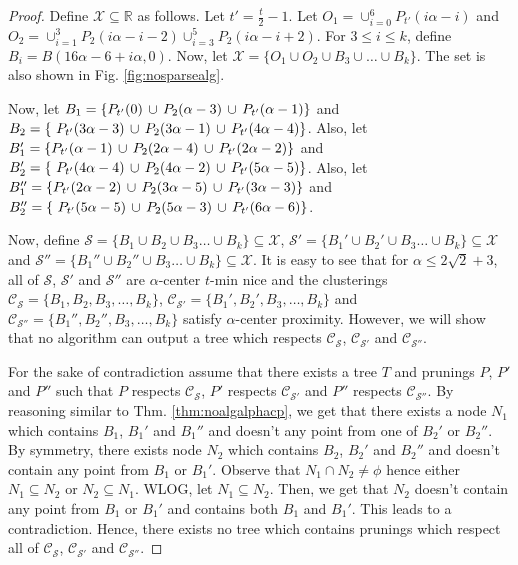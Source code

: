 \documentclass[anon,12pt]{colt2016} %
\newcommand{\mc}{\mathcal}
\begin{document}
\begin{proof}
Define $\mc X \subseteq \mathbb{R}$ as follows. Let $t' = \frac{t}{2}-1$. Let $O_1 = \cup_{i=0}^6 P_{t'}(i\alpha-i)$ and $O_2 = \cup_{i=1}^3 P_2(i\alpha-i-2) \cup_{i=3}^5 P_2(i\alpha-i+2)$. For $3\le i\le k$, define $B_i = B(16\alpha-6+i\alpha, 0)$. Now, let $\mc X = \{O_1 \cup O_2 \cup B_3 \cup \ldots \cup B_k\}$. The set is also shown in Fig. \ref{fig:nosparsealg}.

Now, let $B_1 = \{P_{t'}(0) \thinspace\cup\thinspace  P_{2}(\alpha-3) \thinspace\cup\thinspace P_{t'}(\alpha-1) \}$ and $B_2 = \{\ P_{t'}(3\alpha-3) \thinspace\cup\thinspace P_{2}(3\alpha-1)\thinspace\cup\thinspace P_{t'}(4\alpha-4)\}$. Also, let $B_1' = \{P_{t'}(\alpha-1) \thinspace\cup\thinspace  P_{2}(2\alpha-4) \thinspace\cup\thinspace P_{t'}(2\alpha-2) \}$ and $B_2' = \{\ P_{t'}(4\alpha-4) \thinspace\cup\thinspace P_{2}(4\alpha-2)\thinspace\cup\thinspace P_{t'}(5\alpha-5)\}$. Also, let $B_1'' = \{P_{t'}(2\alpha-2) \thinspace\cup\thinspace  P_{2}(3\alpha-5) \thinspace\cup\thinspace P_{t'}(3\alpha-3) \}$ and $B_2'' = \{\ P_{t'}(5\alpha-5) \thinspace\cup\thinspace P_{2}(5\alpha-3)\thinspace\cup\thinspace P_{t'}(6\alpha-6)\}$. 

Now, define $\mc S = \{B_1 \cup B_2 \cup B_3\ldots \cup B_k\} \subseteq \mc X$, $\mc S' = \{B_1' \cup B_2' \cup B_3\ldots \cup B_k\} \subseteq \mc X$ and $\mc S'' = \{B_1'' \cup B_2'' \cup B_3\ldots \cup B_k\} \subseteq \mc X$. It is easy to see that for $\alpha \le 2\sqrt{2} + 3$, all of $\mc S$, $\mc S'$ and $\mc S''$ are $\alpha$-center $t$-min nice and the clusterings $\mc C_{\mc S} = \{B_1, B_2, B_3, \ldots, B_k\}$, $\mc C_{\mc S'} = \{B_1', B_2', B_3, \ldots, B_k\}$ and $\mc C_{\mc S''} = \{B_1'', B_2'', B_3, \ldots, B_k\}$ satisfy $\alpha$-center proximity. However, we will show that no algorithm can output a tree which respects $\mc C_{\mc S}$, $\mc C_{\mc S'}$ and $\mc C_{\mc S''}$.

For the sake of contradiction assume that there exists a tree $T$ and prunings $P$, $P'$ and $P''$ such that $P$ respects $\mc C_{\mc S}$, $P'$ respects $\mc C_{\mc S'}$ and $P''$ respects $\mc C_{\mc S''}$. By reasoning similar to Thm. \ref{thm:noalgalphacp}, we get that there exists a node $N_1$ which contains $B_1$, $B_1'$ and $B_1''$ and doesn't any point from one of $B_2'$ or $B_2''$. By symmetry, there exists node $N_2$ which contains $B_2$, $B_2'$ and $B_2''$ and doesn't contain any point from $B_1$ or $B_1'$. Observe that $N_1 \cap N_2 \neq \phi$ hence either $N_1 \subseteq N_2$ or $N_2 \subseteq N_1$. WLOG, let $N_1 \subseteq N_2$. Then, we get that $N_2$ doesn't contain any point from $B_1$ or $B_1'$ and contains both $B_1$ and $B_1'$. This leads to a contradiction. Hence, there exists no tree which contains prunings which respect all of $\mc C_{\mc S}$, $\mc C_{\mc S'}$ and $\mc C_{\mc S''}$.
\end{proof}
\end{document}
